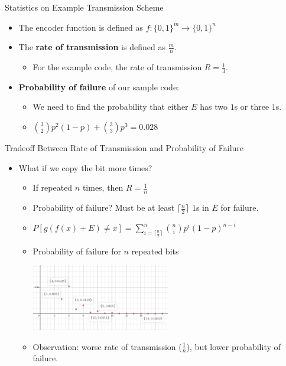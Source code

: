 \documentclass[aspectratio=169]{beamer}
\newcommand{\ceil}[1]{\lceil #1 \rceil}
\begin{document}
\begin{frame}{Statistics on Example Transmission Scheme}
  \begin{itemize}
    \item The encoder function is defined as $f: \{0, 1\}^{m} \to \{0, 1\}^{n}$
    \item The \textbf{rate of transmission} is defined as $\frac{m}{n}$.
          \begin{itemize}
            \item For the example code, the rate of transmission $R = \frac{1}{3}$.
            \end{itemize}
    \item \textbf{Probability of failure} of our sample code:
          \begin{itemize}
                \item We need to find the probability that either $E$ has two $1$s or three $1$s.
                \item $\binom{3}{2} p^{2}(1-p) + \binom{3}{3} p^{3} = 0.028 $
            \end{itemize}
          \end{itemize}
  \end{frame}
\begin{frame}{Tradeoff Between Rate of Transmission and Probability of Failure}
  \begin{itemize}
    \item What if we copy the bit more times?
          \begin{itemize}
                \item If repeated $n$ times, then $R = \frac{1}{n}$
                \item Probability of failure? Must be at least $\ceil{\frac{n}{2}}$ $1$s in $E$ for failure.
            \item $P[g(f(x) + E) \ne x] = \sum_{i=\ceil{\frac{n}{2}}}^n \binom{n}{i}p^{i}(1-p)^{n-i} $
            \item Probability of failure for $n$ repeated bits\\ \begin{minipage}{\linewidth}  \includegraphics[width=0.5\textwidth]{repeated_bit_prob} \end{minipage}
            \item Observation: worse rate of transmission ($\frac{1}{n}$), but lower probability of failure.
          \end{itemize}
    \end{itemize}
  \end{frame}
\end{document}
